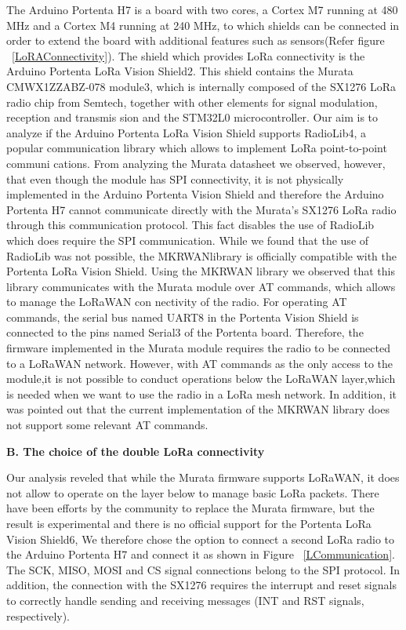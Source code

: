 The Arduino Portenta H7 is a board with two cores, a
Cortex M7 running at 480 MHz and a Cortex M4 running
at 240 MHz, to which shields can be connected in order
to extend the board with additional features such as sensors(Refer figure ~\ref{LoRAConnectivity}).
The shield which provides LoRa connectivity is the Arduino
Portenta LoRa Vision Shield2. This shield contains the Murata
CMWX1ZZABZ-078 module3, which is internally composed
of the SX1276 LoRa radio chip from Semtech, together with
other elements for signal modulation, reception and transmis
sion and the STM32L0 microcontroller. \cite{PortentaLANMAN2022}
\newline
Our aim is to analyze if the Arduino Portenta LoRa Vision
Shield supports RadioLib4, a popular communication library
which allows to implement LoRa point-to-point communi
cations. From analyzing the Murata datasheet we observed,
however, that even though the module has SPI connectivity,
it is not physically implemented in the Arduino Portenta
Vision Shield and therefore the Arduino Portenta H7 cannot
communicate directly with the Murata’s SX1276 LoRa radio
through this communication protocol. This fact disables the
use of RadioLib which does require the SPI communication.
While we found that the use of RadioLib was not possible,
the MKRWANlibrary is officially compatible with the Portenta
LoRa Vision Shield. Using the MKRWAN library we observed
that this library communicates with the Murata module over
AT commands, which allows to manage the LoRaWAN con
nectivity of the radio. For operating AT commands, the serial
bus named UART8 in the Portenta Vision Shield is connected
to the pins named Serial3 of the Portenta board. Therefore, the
firmware implemented in the Murata module requires the radio
to be connected to a LoRaWAN network. However, with AT
commands as the only access to the module,it is not possible to
conduct operations below the LoRaWAN layer,which is needed
when we want to use the radio in a LoRa mesh network. In
addition, it was pointed out that the current implementation
of the MKRWAN library does not support some relevant AT
commands. \cite{PortentaLANMAN2022} \newline

\textbf{B. The choice of the double LoRa connectivity}\newline

Our analysis reveled that while the Murata firmware supports
LoRaWAN, it does not allow to operate on the layer below to
manage basic LoRa packets. There have been efforts by the
community to replace the Murata firmware, but the result is
experimental and there is no official support for the Portenta
LoRa Vision Shield6,
We therefore chose the option to connect a second LoRa
radio to the Arduino Portenta H7 and connect it as shown in
Figure ~\ref{LCommunication}. The SCK, MISO, MOSI and CS signal connections
belong to the SPI protocol. In addition, the connection with
the SX1276 requires the interrupt and reset signals to correctly
handle sending and receiving messages (INT and RST signals,
respectively). \cite{PortentaLANMAN2022} \newline

